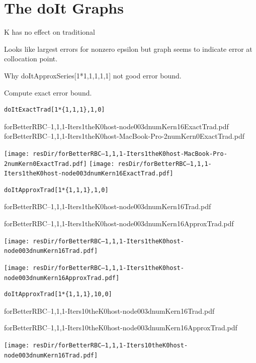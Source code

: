 \documentclass[12pt]{article}
\begin{document}
\section{The doIt Graphs}
\label{sec:doit-graphs}

K has no effect on traditional

Looks like largest errors for nonzero epsilon but graph seems to indicate error at collocation point.

Why doItApproxSeries[1*{1,1,1},1,1] not good error bound.

Compute exact error bound.

\newpage



\begin{verbatim}
doItExactTrad[1*{1,1,1},1,0]
\end{verbatim}

forBetterRBC--1,1,1-Iters1theK0host-node003dnumKern16ExactTrad.pdf
forBetterRBC--1,1,1-Iters1theK0host-MacBook-Pro-2numKern0ExactTrad.pdf

\ifmacosx
  \texttt{[image: resDir/forBetterRBC--1,1,1-Iters1theK0host-MacBook-Pro-2numKern0ExactTrad.pdf]}
  \fi
\iflinux
  \texttt{[image: resDir/forBetterRBC--1,1,1-Iters1theK0host-node003dnumKern16ExactTrad.pdf]}
\fi
\newpage

\begin{verbatim}
doItApproxTrad[1*{1,1,1},1,0]
\end{verbatim}

forBetterRBC--1,1,1-Iters1theK0host-node003dnumKern16Trad.pdf

forBetterRBC--1,1,1-Iters1theK0host-node003dnumKern16ApproxTrad.pdf



\ifmacosx
  \fi
\iflinux
  \texttt{[image: resDir/forBetterRBC--1,1,1-Iters1theK0host-node003dnumKern16Trad.pdf]}


  \texttt{[image: resDir/forBetterRBC--1,1,1-Iters1theK0host-node003dnumKern16ApproxTrad.pdf]}
\fi

\newpage
\begin{verbatim}
doItApproxTrad[1*{1,1,1},10,0]
\end{verbatim}

forBetterRBC--1,1,1-Iters10theK0host-node003dnumKern16Trad.pdf

forBetterRBC--1,1,1-Iters10theK0host-node003dnumKern16ApproxTrad.pdf



\ifmacosx
  \fi
\iflinux
  \texttt{[image: resDir/forBetterRBC--1,1,1-Iters10theK0host-node003dnumKern16Trad.pdf]}
\end{document}
